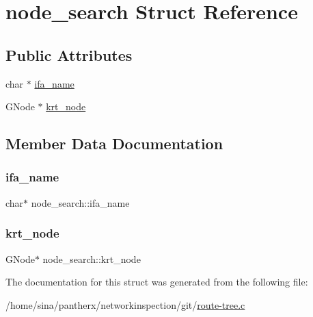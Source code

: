 \hypertarget{structnode__search}{}\section{node\+\_\+search Struct Reference}
\label{structnode__search}
\subsection*{Public Attributes}
\begin{DoxyCompactItemize}
\item 
char $\ast$ \hyperlink{structnode__search_ac34f755e54e8377475e42e4d9b1166cd}{ifa\+\_\+name}
\item 
G\+Node $\ast$ \hyperlink{structnode__search_acef2809bd08e8676c77b64dbb9f933d1}{krt\+\_\+node}
\end{DoxyCompactItemize}


\subsection{Member Data Documentation}
\mbox{\label{structnode__search_ac34f755e54e8377475e42e4d9b1166cd}} 
\subsubsection{\texorpdfstring{ifa\+\_\+name}{ifa\_name}}
{\footnotesize\ttfamily char$\ast$ node\+\_\+search\+::ifa\+\_\+name}

\mbox{\label{structnode__search_acef2809bd08e8676c77b64dbb9f933d1}} 
\subsubsection{\texorpdfstring{krt\+\_\+node}{krt\_node}}
{\footnotesize\ttfamily G\+Node$\ast$ node\+\_\+search\+::krt\+\_\+node}



The documentation for this struct was generated from the following file\+:\begin{DoxyCompactItemize}
\item 
/home/sina/pantherx/networkinspection/git/\hyperlink{route-tree_8c}{route-\/tree.\+c}\end{DoxyCompactItemize}
